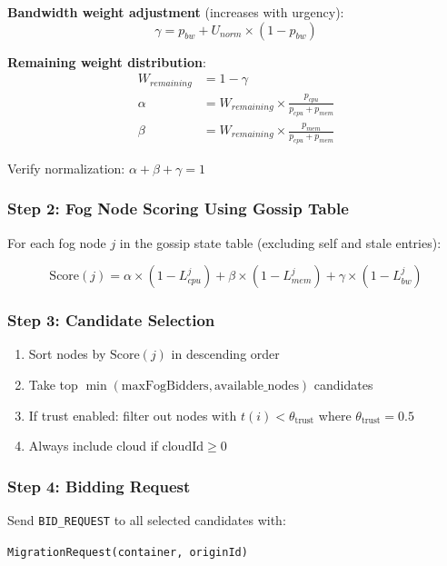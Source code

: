 \documentclass[12pt,a4paper]{article}
\begin{document}
\textbf{Bandwidth weight adjustment} (increases with urgency):
\begin{equation}
    \gamma = p_{bw} + U_{norm} \times (1 - p_{bw})
\end{equation}

\textbf{Remaining weight distribution}:
\begin{align}
    W_{remaining} &= 1 - \gamma \\
    \alpha &= W_{remaining} \times \frac{p_{cpu}}{p_{cpu} + p_{mem}} \\
    \beta &= W_{remaining} \times \frac{p_{mem}}{p_{cpu} + p_{mem}}
\end{align}

Verify normalization: $\alpha + \beta + \gamma = 1$

\subsubsection{Step 2: Fog Node Scoring Using Gossip Table}

For each fog node $j$ in the gossip state table (excluding self and stale entries):

\begin{equation}
    \text{Score}(j) = \alpha \times (1 - L_{cpu}^j) + \beta \times (1 - L_{mem}^j) + \gamma \times (1 - L_{bw}^j)
\end{equation}

\subsubsection{Step 3: Candidate Selection}

\begin{enumerate}
    \item Sort nodes by $\text{Score}(j)$ in descending order
    \item Take top $\min(\text{maxFogBidders}, \text{available\_nodes})$ candidates
    \item If trust enabled: filter out nodes with $t(i) < \theta_{\text{trust}}$ where $\theta_{\text{trust}} = 0.5$
    \item Always include cloud if $\text{cloudId} \geq 0$
\end{enumerate}

\subsubsection{Step 4: Bidding Request}

Send \texttt{BID\_REQUEST} to all selected candidates with:
\begin{center}
\texttt{MigrationRequest(container, originId)}
\end{center}
\end{document}

